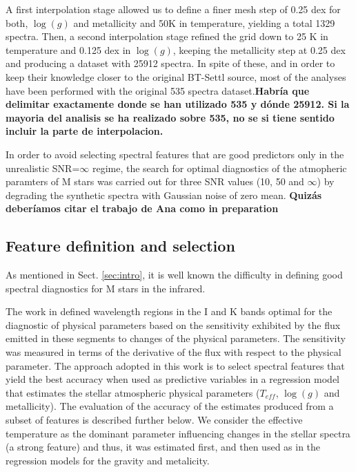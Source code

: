 

A first interpolation stage allowed us to define a finer mesh step of
0.25 dex for both, $\log(g)$ and metallicity and 50K in temperature,
yielding a total 1329 spectra.  Then, a second interpolation stage
refined the grid down to 25 K in temperature and 0.125 dex in
$\log(g)$, keeping the metallicity step at 0.25 dex and producing a
dataset with 25912 spectra.  In spite of these, and in order to keep
their knowledge closer to the original BT-Settl source, most of the
analyses have been performed with the original 535 spectra
dataset.{\bf Habría que delimitar exactamente donde se han utilizado
535 y dónde 25912. Si la mayoria del analisis se ha realizado sobre
535, no se si tiene sentido incluir la parte de interpolacion.}


In order to avoid selecting spectral features that are good predictors
only in the unrealistic SNR=$\infty$ regime, the search for optimal
diagnostics of the atmopheric paramters of M stars was carried out for
three SNR values (10, 50 and $\infty$) by degrading the synthetic
spectra with Gaussian noise of zero mean.  {\bf Quizás deberíamos
citar el trabajo de Ana como in preparation}

\subsection{Feature definition and selection}
\label{subsec:FD}
As mentioned in Sect. \ref{sec:intro}, it is well known the
difficulty in defining good spectral diagnostics for M stars in the
infrared.

The work in \cite{cesetti} defined wavelength regions in the I and K
bands optimal for the diagnostic of physical parameters based on the
sensitivity exhibited by the flux emitted in these segments to changes
of the physical parameters. The sensitivity was measured in terms of
the derivative of the flux with respect to the physical parameter. The
approach adopted in this work is to select spectral features that
yield the best accuracy when used as predictive variables in a
regression model that estimates the stellar atmospheric physical
parameters ($T_{eff}$, $\log(g)$ and metallicity). The evaluation of
the accuracy of the estimates produced from a subset of features is
described further below. We consider the effective temperature as the
dominant parameter influencing changes in the stellar spectra (a
strong feature) and thus, it was estimated first, and then used as in
the regression models for the gravity and metalicity.

